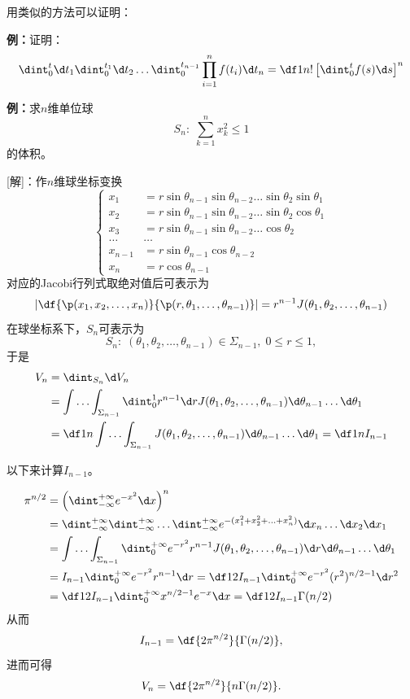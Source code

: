 用类似的方法可以证明：

{\bf 例：}证明：
$$\dint_0^t\d t_1\dint_0^{t_1}\d t_2\ldots
\dint_0^{t_{n-1}}\prod\limits_{i=1}^nf(t_i)\d t_n
=\df 1{n!}\left[\dint_0^tf(s)\d s\right]^n$$

{\bf 例：}求$n$维单位球
$$S_n:\;\sum\limits_{k=1}^nx_k^2\leq 1$$
的体积。

[解]：作$n$维球坐标变换
$$
\left\{\begin{array}{rl}
	x_1&=r\sin\theta_{n-1}\sin\theta_{n-2}\ldots\sin\theta_{2}\sin\theta_1\\
	x_2&=r\sin\theta_{n-1}\sin\theta_{n-2}\ldots\sin\theta_{2}\cos\theta_1\\
	x_3&=r\sin\theta_{n-1}\sin\theta_{n-2}\ldots\cos\theta_{2}\\
	\ldots&\ldots\\
	x_{n-1}&=r\sin\theta_{n-1}\cos\theta_{n-2}\\
	x_n&=r\cos\theta_{n-1}
\end{array}\right.
$$
对应的Jacobi行列式取绝对值后可表示为
$$\left|\df{\p(x_1,x_2,\ldots,x_n)}{\p(r,\theta_1,\ldots,\theta_{n-1})}\right|
=r^{n-1}J(\theta_1,\theta_2,\ldots,\theta_{n-1})$$
在球坐标系下，$S_n$可表示为
$$S_n:
\;(\theta_1,\theta_2,\ldots,\theta_{n-1})\in\Sigma_{n-1},
\;0\leq r\leq 1,$$
于是
\begin{align*}
	V_n&=\dint_{S_n}\d V_n\\
	&=\int\ldots\int_{\Sigma_{n-1}}\dint_0^1
	r^{n-1}\d rJ(\theta_1,\theta_2,\ldots,\theta_{n-1})
	\d\theta_{n-1}\ldots\d\theta_1\\
	&=\df1n\int\ldots\int_{\Sigma_{n-1}}
	J(\theta_1,\theta_2,\ldots,\theta_{n-1})\d\theta_{n-1}\ldots\d\theta_1
	=\df1nI_{n-1}
\end{align*}

以下来计算$I_{n-1}$。

\begin{align*}
	\pi^{n/2}&=\left(\dint_{-\infty}^{+\infty}e^{-x^2}\d x\right)^n\\
	&=\dint_{-\infty}^{+\infty}\dint_{-\infty}^{+\infty}\ldots
	\dint_{-\infty}^{+\infty}e^{-(x_1^2+x_2^2+\ldots+x_n^2)}\d x_n\ldots
	\d x_2\d x_1\\
	&=\int\ldots\int_{\Sigma_{n-1}}\dint_0^{+\infty}
	e^{-r^2}r^{n-1}J(\theta_1,\theta_2,\ldots,\theta_{n-1})
	\d r\d\theta_{n-1}\ldots\d\theta_1\\
	&=I_{n-1}\dint_0^{+\infty}e^{-r^2}r^{n-1}\d r
	=\df12I_{n-1}\dint_0^{+\infty}e^{-r^2}(r^2)^{n/2-1}\d r^2\\
	&=\df12I_{n-1}\dint_0^{+\infty}x^{n/2-1}e^{-x}\d x
	=\df12I_{n-1}\Gamma(n/2)
\end{align*}
从而
$$I_{n-1}=\df{2\pi^{n/2}}{\Gamma(n/2)},$$
进而可得
$$V_n=\df{2\pi^{n/2}}{n\Gamma(n/2)}.$$
\fin

